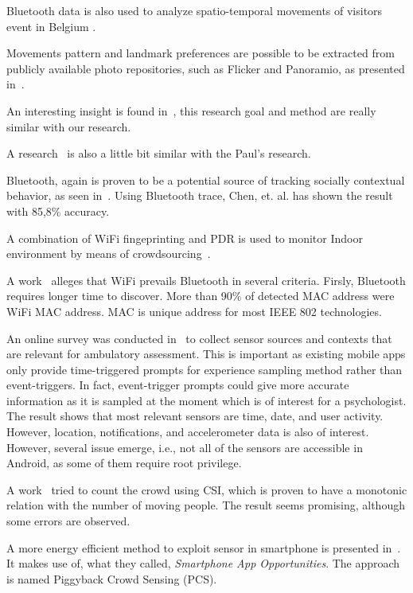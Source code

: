 \documentclass{article}
\begin{document}
Bluetooth data is also used to analyze spatio-temporal movements of visitors event in Belgium \cite{thesis016}.

Movements pattern and landmark preferences are possible to be extracted from publicly available photo repositories, such as Flicker and Panoramio, as presented in~\cite{thesis026}.

An interesting insight is found in~\cite{thesis031}, this research goal and method are really similar with our research.

A research~\cite{thesis030} is also a little bit similar with the Paul's research.

Bluetooth, again is proven to be a potential source of tracking socially contextual behavior, as seen in~\cite{thesis028}. Using Bluetooth trace, Chen, et. al. has shown the result with 85,8\% accuracy.

A combination of WiFi fingeprinting and PDR is used to monitor Indoor environment by means of crowdsourcing~\cite{thesis020}.

A work~\cite{thesis009} alleges that WiFi prevails Bluetooth in several criteria. Firsly, Bluetooth requires longer time to discover. More than 90\% of detected MAC address were WiFi MAC address. MAC is unique address for most IEEE 802 technologies.

An online survey was conducted in~\cite{thesis001} to collect sensor sources and contexts that are relevant for ambulatory assessment. This is important as existing mobile apps only provide time-triggered prompts for experience sampling method rather than event-triggers. In fact, event-trigger prompts could give more accurate information as it is sampled at the moment which is of interest for a psychologist. The result shows that most relevant sensors are time, date, and user activity. However, location, notifications, and accelerometer data is also of interest. However, several issue emerge, i.e., not all of the sensors are accessible in Android, as some of them require root privilege.

A work~\cite{thesis006} tried to count the crowd using CSI, which is proven to have a monotonic relation with the number of moving people. The result seems promising, although some errors are observed.

A more energy efficient method to exploit sensor in smartphone is presented in~\cite{thesis040}. It makes use of, what they called, \textit{Smartphone App Opportunities}. The approach is named Piggyback Crowd Sensing (PCS).
\end{document}
